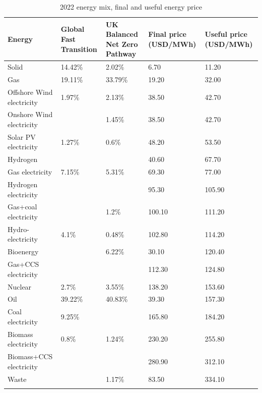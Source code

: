 \begin{longtable}{P{5cm}P{3cm}P{2cm}P{3cm}P{3cm}}
\caption{2022 energy mix, final and useful energy price} \\ 
  \hline
Energy & Global Fast Transition & UK Balanced Net Zero Pathway & Final price (USD/MWh) & Useful price (USD/MWh) \\ 
  \hline
Solid & 14.42\% & 2.02\% & 6.70 & 11.20 \\ 
  Gas & 19.11\% & 33.79\% & 19.20 & 32.00 \\ 
  Offshore Wind electricity & 1.97\% & 2.13\% & 38.50 & 42.70 \\ 
  Onshore Wind electricity &  & 1.45\% & 38.50 & 42.70 \\ 
  Solar PV electricity & 1.27\% & 0.6\% & 48.20 & 53.50 \\ 
  Hydrogen &  &  & 40.60 & 67.70 \\ 
  Gas electricity & 7.15\% & 5.31\% & 69.30 & 77.00 \\ 
  Hydrogen electricity &  &  & 95.30 & 105.90 \\ 
  Gas+coal electricity &  & 1.2\% & 100.10 & 111.20 \\ 
  Hydro-electricity & 4.1\% & 0.48\% & 102.80 & 114.20 \\ 
  Bioenergy &  & 6.22\% & 30.10 & 120.40 \\ 
  Gas+CCS electricity &  &  & 112.30 & 124.80 \\ 
  Nuclear & 2.7\% & 3.55\% & 138.20 & 153.60 \\ 
  Oil & 39.22\% & 40.83\% & 39.30 & 157.30 \\ 
  Coal electricity & 9.25\% &  & 165.80 & 184.20 \\ 
  Biomass electricity & 0.8\% & 1.24\% & 230.20 & 255.80 \\ 
  Biomass+CCS electricity &  &  & 280.90 & 312.10 \\ 
  Waste &  & 1.17\% & 83.50 & 334.10 \\ 
   \hline
\hline
\label{tab_initial_price_energy}
\end{longtable}
